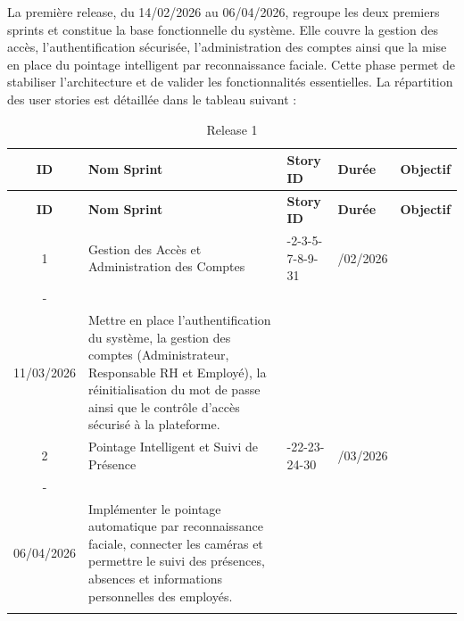 La première release, du 14/02/2026 au 06/04/2026, regroupe les deux premiers sprints et constitue la base fonctionnelle du système. Elle couvre la gestion des accès, l’authentification sécurisée, l’administration des comptes ainsi que la mise en place du pointage intelligent par reconnaissance faciale. Cette phase permet de stabiliser l’architecture et de valider les fonctionnalités essentielles.
La répartition des user stories est détaillée dans le tableau suivant :
\begin{center}
\begin{longtable}{|c|>{\raggedright\arraybackslash}p{2.5cm}|
    >{\centering\arraybackslash}p{2.5cm}|
    >{\centering\arraybackslash}p{3cm}|
    >{\raggedright\arraybackslash}p{5cm}|}
\hline
\textbf{ID} & \textbf{Nom Sprint} & \textbf{Story ID} & \textbf{Durée} & \textbf{Objectif} \\
\hline
\endfirsthead
\hline
\textbf{ID} & \textbf{Nom Sprint} & \textbf{Story ID} & \textbf{Durée} & \textbf{Objectif} \\
\hline
\endhead
1 & Gestion des Accès et Administration des Comptes
  & 1-2-3-5-7-8-9-31
  & \centering 14/02/2026\\-\\11/03/2026
  & Mettre en place l'authentification du système, la gestion des comptes
    (Administrateur, Responsable RH et Employé), la réinitialisation du mot de
    passe ainsi que le contrôle d'accès sécurisé à la plateforme. \\ \hline
2 & Pointage Intelligent et Suivi de Présence
  & 10-22-23-24-30
  & \centering 12/03/2026\\-\\06/04/2026
  & Implémenter le pointage automatique par reconnaissance faciale, connecter
    les caméras et permettre le suivi des présences, absences et informations
    personnelles des employés. \\ \hline
\caption{Release 1}
\end{longtable}
\end{center}

